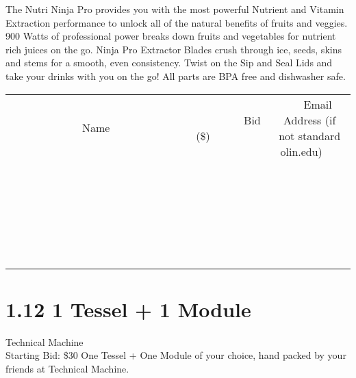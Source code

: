 \documentclass[11pt]{article}
\begin{document}
The Nutri Ninja Pro provides you with the most powerful Nutrient and Vitamin Extraction performance to unlock all of the natural benefits of fruits and veggies. 900 Watts of professional power breaks down fruits and vegetables for nutrient rich juices on the go. Ninja Pro Extractor Blades crush through ice, seeds, skins and stems for a smooth, even consistency. Twist on the Sip and Seal Lids and take your drinks with you on the go! All parts are BPA free and dishwasher safe.
\\[6ex]
\begin{tabular}{c c c}
~~~~~~~~~~~~~Name~~~~~~~~~~~~~ & ~~~~~~~~~Bid (\$)~~~~~~~~~  & ~~~Email Address (if not standard olin.edu)~~~\\
 & & \\
\hline
 & & \\
\hline
 & & \\
\hline
 & & \\
\hline
 & & \\
\hline
 & & \\
\hline
 & & \\
\hline
 & & \\
\hline
 & & \\
\hline
 & & \\
\hline
 & & \\
\hline
 & & \\
\hline
 & & \\
\hline
 & & \\
\hline
 & & \\
\hline
 & & \\
\hline
 & & \\
\hline
 & & \\
\hline
 & & \\
\hline
 & & \\
\hline
 & & \\
\hline
 & & \\
\hline
 & & \\
\hline
 & & \\
\hline
 & & \\
\hline
 & & \\
\hline
\end{tabular}
\newpage
\section*{1.12 1 Tessel + 1 Module}
Technical Machine
\\
Starting Bid: \$30
\newline
One Tessel + One Module of your choice, hand packed by your friends at Technical Machine.
\end{document}
